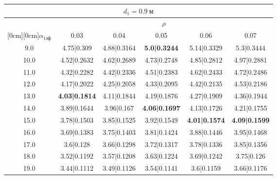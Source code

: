 \documentclass[20pt]{article}
\begin{document}
\begin{center}
\begin{tabular}{c|ccccc}
\hline
	\multicolumn{6}{c}{$d_{1}=0.9 \ м$} \\
\hline
	 & \multicolumn{5}{|c}{$\rho$} \\
	\cline{2-6}
	\raisebox{1.5ex}[0cm][0cm]{$\alpha_{1эф}$} & 0.03 & 0.04 & 0.05 & 0.06 & 0.07\\
\hline
	9.0 & 	4.75|0.309 & 	4.88|0.3164 & 	\textbf{5.0|0.3244} & 	5.14|0.3329 & 	5.3|0.3444\\
	10.0 & 	4.52|0.2632 & 	4.62|0.2689 & 	4.73|0.2748 & 	4.85|0.2812 & 	4.97|0.2881\\
	11.0 & 	4.32|0.2282 & 	4.42|0.2336 & 	4.51|0.2383 & 	4.62|0.2433 & 	4.72|0.2486\\
	12.0 & 	4.17|0.2022 & 	4.25|0.2058 & 	4.33|0.2095 & 	4.42|0.2135 & 	4.53|0.2186\\
	13.0 & 	\textbf{4.03|0.1814} & 	4.11|0.1844 & 	4.19|0.1876 & 	4.27|0.1909 & 	4.36|0.1944\\
	14.0 & 	3.89|0.1644 & 	3.96|0.167 & 	\textbf{4.06|0.1697} & 	4.13|0.1726 & 	4.21|0.1755\\
	15.0 & 	3.78|0.1503 & 	3.85|0.1525 & 	3.92|0.1549 & 	\textbf{4.01|0.1574} & 	\textbf{4.09|0.1599}\\
	16.0 & 	3.69|0.1383 & 	3.75|0.1403 & 	3.81|0.1424 & 	3.88|0.1446 & 	3.95|0.1468\\
	17.0 & 	3.6|0.128 & 	3.66|0.1298 & 	3.72|0.1317 & 	3.78|0.1336 & 	3.85|0.1356\\
	18.0 & 	3.52|0.1192 & 	3.57|0.1208 & 	3.63|0.1224 & 	3.69|0.1242 & 	3.75|0.126\\
	19.0 & 	3.44|0.1112 & 	3.49|0.1126 & 	3.54|0.1141 & 	3.6|0.1159 & 	3.66|0.1176\\
\end{tabular}


\end{center}
\end{document}

